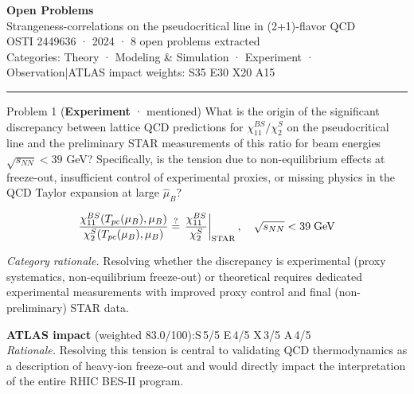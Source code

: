 \documentclass[11pt,letterpaper]{article}
\begin{document}
\begin{center}
{\LARGE\bfseries\color{ink} Open Problems}\\[4pt]
{\large\color{accent} Strangeness-correlations on the pseudocritical line in (2+1)-flavor QCD}\\[6pt]
{\small\color{ink} OSTI 2449636 · 2024 · 8 open problems extracted}\\[2pt]
{\footnotesize Categories: \textcolor{catTheory}{Theory} · \textcolor{catModel}{Modeling \& Simulation} · \textcolor{catExp}{Experiment} · \textcolor{catObs}{Observation}\quad|\quad ATLAS impact weights: S35 E30 X20 A15}
\end{center}
\vspace{4pt}
\hrule
\vspace{8pt}

\begin{opbox}{Problem 1 \textnormal{\small(\textcolor{catExp}{\textbf{Experiment}} · mentioned)}}
What is the origin of the significant discrepancy between lattice QCD predictions for $\chi_{11}^{BS}/\chi_2^S$ on the pseudocritical line and the preliminary STAR measurements of this ratio for beam energies $\sqrt{s_{NN}} < 39$ GeV? Specifically, is the tension due to non-equilibrium effects at freeze-out, insufficient control of experimental proxies, or missing physics in the QCD Taylor expansion at large $\hat{\mu}_B$?
\vspace{2pt}\begin{mathcap}\[\frac{\chi_{11}^{BS}(T_{pc}(\mu_B),\mu_B)}{\chi_2^S(T_{pc}(\mu_B),\mu_B)} \stackrel{?}{=} \left.\frac{\chi_{11}^{BS}}{\chi_2^S}\right|_{\rm STAR},\quad \sqrt{s_{NN}} < 39\;\text{GeV}\]\end{mathcap}
\vspace{3pt}
{\small\textit{Category rationale.} Resolving whether the discrepancy is experimental (proxy systematics, non-equilibrium freeze-out) or theoretical requires dedicated experimental measurements with improved proxy control and final (non-preliminary) STAR data.}
\vspace{3pt}

{\footnotesize\textbf{ATLAS impact} (weighted 83.0/100):\quad S\,5/5 \quad E\,4/5 \quad X\,3/5 \quad A\,4/5\\
\textit{Rationale.} Resolving this tension is central to validating QCD thermodynamics as a description of heavy-ion freeze-out and would directly impact the interpretation of the entire RHIC BES-II program.}
\end{opbox}
\end{document}
